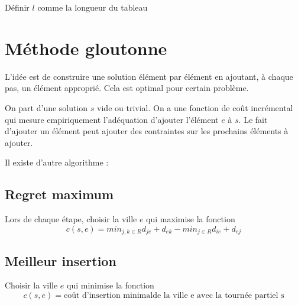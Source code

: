 \documentclass[11pt,a4paper]{report}
\begin{document}
\begin{algorithm}[H]
Définir $l$ comme la longueur du tableau\;
\end{algorithm}

\section{Méthode gloutonne}

L'idée est de construire une solution élément par élément en ajoutant, à chaque pas, un élément approprié. Cela est optimal pour certain problème.

On part d'une solution $s$ vide ou trivial. On a une fonction de coût incrémental qui mesure empiriquement l'adéquation d'ajouter l'élément $e$ à $s$. Le fait d'ajouter un élément peut ajouter des contraintes sur les prochains éléments à ajouter.

\begin{algorithm}[H]

\end{algorithm}

Il existe d'autre algorithme :

\subsection{Regret maximum}
Lors de chaque étape, choisir la ville $e$ qui maximise la fonction
$$
c(s,e) = min_{j,k \in R}d_{je} + d_{ek} - min_{j \in R} d_{ie} + d_{ej}
$$ 

\subsection{Meilleur insertion}
Choisir la ville $e$ qui minimise la fonction
$$
c(s,e) = \text{coût d'insertion minimalde la ville e avec la tournée partiel s}
$$
\end{document}
